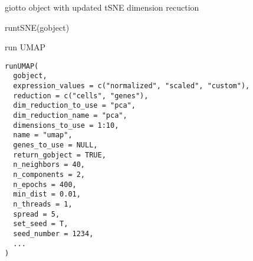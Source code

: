 \documentclass[a4paper]{book}
\begin{document}
%
\begin{Value}
giotto object with updated tSNE dimension recuction
\end{Value}
%
\begin{Examples}
\begin{ExampleCode}
    runtSNE(gobject)
\end{ExampleCode}
\end{Examples}
%
\begin{Description}\relax
run UMAP
\end{Description}
%
\begin{Usage}
\begin{verbatim}
runUMAP(
  gobject,
  expression_values = c("normalized", "scaled", "custom"),
  reduction = c("cells", "genes"),
  dim_reduction_to_use = "pca",
  dim_reduction_name = "pca",
  dimensions_to_use = 1:10,
  name = "umap",
  genes_to_use = NULL,
  return_gobject = TRUE,
  n_neighbors = 40,
  n_components = 2,
  n_epochs = 400,
  min_dist = 0.01,
  n_threads = 1,
  spread = 5,
  set_seed = T,
  seed_number = 1234,
  ...
)
\end{verbatim}
\end{Usage}
%
\end{document}
